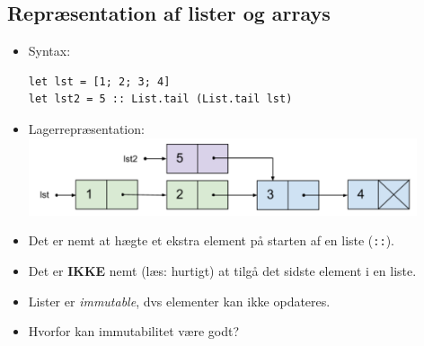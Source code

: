\documentclass[rgb]{beamer}
\begin{document}
\popmaketitleframe

\subsection{Repræsentation af lister og arrays}

\begin{frame}[fragile]
\begin{footnotesize}


  \begin{itemize}
  \item Syntax:
\begin{lstlisting}[numbers=none,frame=none]
let lst = [1; 2; 3; 4]
let lst2 = 5 :: List.tail (List.tail lst)
\end{lstlisting}

  \item Lagerrepræsentation:
    \includegraphics[width=0.9\textwidth]{list1234.png}

  \item Det er nemt at hægte et ekstra element på starten af en liste (\texttt{::}).

  \item Det er \textbf{IKKE} nemt (læs: hurtigt) at tilgå det sidste element i en liste.

  \item Lister er \emph{immutable}, dvs elementer kan ikke opdateres.

  \item Hvorfor kan immutabilitet være godt?
  \end{itemize}
\end{footnotesize}
\end{frame}
\end{document}
